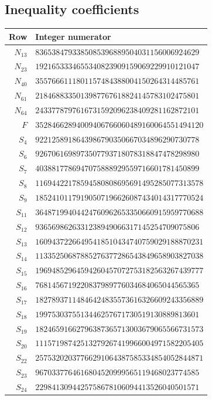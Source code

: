 \documentclass[12pt,a4paper]{article}
\numberwithin{equation}{section}
\theoremstyle{definition}
\begin{document}
\subsection*{Inequality coefficients}
{\small
\setlength{\tabcolsep}{8pt}
\begin{longtable}{rl}
\toprule
Row & Integer numerator\\
\midrule\endhead
$N_{13}$ & $8365384793385085396889504031156006924629$\\
$N_{23}$ & $1921653334655340823909159069229910121047$\\
$N_{40}$ & $3557666111801157484388004150264314485761$\\
$N_{61}$ & $2184688335013987767618824145783102475801$\\
$N_{64}$ & $2433778797616731592096238409281162872101$\\
$F$ & $35284662894009406766060489160064551494120$\\
$S_{4}$ & $9221258918643986790350667034896290730778$\\
$S_{6}$ & $9267061698973507793718078318847478298980$\\
$S_{7}$ & $4038817786947075888929559716601781450899$\\
$S_{8}$ & $11694422178594580808695691495285077313578$\\
$S_{9}$ & $18524101179190507196626087434014317770524$\\
$S_{11}$ & $36487199404424760962653350660915959770688$\\
$S_{12}$ & $9365698626331238949066317145254709075806$\\
$S_{13}$ & $16094372266495418510434740759029188870231$\\
$S_{14}$ & $11335250687885276377286543849658903827038$\\
$S_{15}$ & $19694852964594260457072753182563267439777$\\
$S_{16}$ & $7681456719220837989776034684065044565365$\\
$S_{17}$ & $18278937114846424835573616326609243356889$\\
$S_{18}$ & $1997530375513446257671730519130889813601$\\
$S_{19}$ & $18246591662796387365713003679065566731573$\\
$S_{20}$ & $11157198742513279267419966004971582205405$\\
$S_{22}$ & $25753202037766291064387585334854052844871$\\
$S_{23}$ & $9670337764616804520999565119468023774585$\\
$S_{24}$ & $2298413094425758678106094413526040501571$\\

\end{longtable}}
\end{document}
